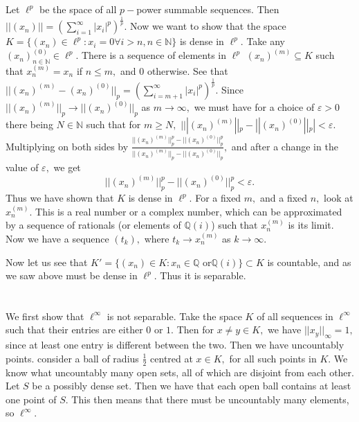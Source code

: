 \documentclass{article}
\begin{document}
\section{} %
Let $\ell^p$ be the space of all $p-$power summable sequences. Then $||(x_n)||=(\sum_{i=1}^{\infty}|x_i|^p)^\frac{1}{p}.$ Now we want to show that the space 
$K=\{(x_n) \in \ell^p: x_i=0 \forall i>n, n \in \mathbb{N}\}$ is dense in $\ell^p.$ Take any $(x_n)^{(0)}_{n \in \mathbb{N}} \in \ell^p.$ There is a 
sequence of elements in $\ell^p$ $(x_n)^{(m)} \subseteq K$ such that $x_n^{(m)}=x_n$ if $n \leq m,$ and $0$ otherwise. See that 
$||(x_n)^{(m)}-(x_n)^{(0)}||_p=\left(\sum_{i=m+1}^{\infty}|x_i|^p\right)^{\frac{1}{p}}.$ Since $||(x_n)^{(m)}||_p \to ||(x_n)^{(0)}||_p$ as $m \to \infty,$ 
we must have for a choice of $\varepsilon >0$ there being $N \in \mathbb{N}$ such that for $m \geq N,$ $|||(x_n)^{(m)}||_p - ||(x_n)^{(0)}||_p|< 
\varepsilon. $ Multiplying on both sides by $\frac{||(x_n)^{(m)}||^p_p - ||(x_n)^{(0)}||^p_p}{||(x_n)^{(m)}||_p - ||(x_n)^{(0)}||_p},$ and after a change in 
the value of $\varepsilon,$ we get $$||(x_n)^{(m)}||^p_p - ||(x_n)^{(0)}||^p_p< \varepsilon.$$ Thus we have shown that $K$ is dense in $\ell^p.$ For a fixed 
$m,$ and a fixed $n,$ look at $x_n^{(m)}.$ This is a real number or a complex number, which can be approximated by a sequence of rationals (or elements of 
$\mathbb{Q}(i)$) such that $x_n^{(m)}$ is its limit. Now we have a sequence $(t_k),$ where $t_k \to x_n^{(m)}$ as $k \to \infty.$ 

Now let us see that $K'=\{(x_n) \in K: x_n \in \mathbb{Q} \text{ or} \mathbb{Q}(i)\} \subset K$ is countable, and as we saw above must be dense in $\ell^p.$ 
Thus it is separable.  
\section{} %
We first show that $\ell^{\infty}$ is not separable. Take the space $K$ of all sequences in $\ell^{\infty}$ such that their entries are either $0$ or $1.$ 
Then for $x \neq y \in K,$ we have $||x_y||_{\infty} = 1,$ since at least one entry is different between the two. Then we have uncountably points. consider 
a ball of radius $\frac{1}{2}$ centred at $x \in K,$ for all such points in $K.$ We know what uncountably many open sets, all of which are disjoint from 
each other. Let $S$ be a possibly dense set. Then we have that each open ball contains at least one point of $S.$ This then means that there must be 
uncountably many elements, so $\ell^{\infty}.$ 
\end{document}
